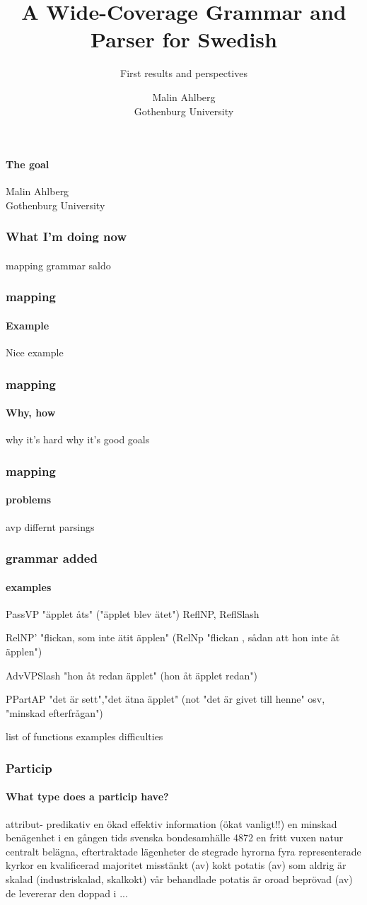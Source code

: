 \documentclass[10pt]{beamer}
\title{A Wide-Coverage Grammar and Parser for Swedish}
\subtitle{\large First results and perspectives}
\author{Malin Ahlberg \\ Gothenburg University}
\date{}
\begin{document}
\maketitle

\begin{frame}
    \framesubtitle{The goal}
    Malin Ahlberg \\
 \pause 
    Gothenburg University
\end{frame}

\begin{frame}
\frametitle{What I'm doing now}
\framesubtitle{} 
mapping
grammar 
saldo
\end{frame}

\begin{frame}
\frametitle{mapping}
\framesubtitle{Example} 
Nice example
\end{frame}


\begin{frame}
\frametitle{mapping}
\framesubtitle{Why, how} 
why it's hard
why it's good
goals
\end{frame}

\begin{frame}
\frametitle{mapping}
\framesubtitle{problems} 
avp
differnt parsings
\end{frame}

\begin{frame}
\frametitle{grammar added}
\framesubtitle{examples} 
PassVP "äpplet åts"
  ("äpplet blev ätet")
ReflNP, ReflSlash

RelNP' "flickan, som inte ätit äpplen"
 (RelNp "flickan , sådan att hon inte åt äpplen")

AdvVPSlash "hon åt redan äpplet" (hon åt äpplet redan")

PPartAP "det är sett","det ätna äpplet"
 (not "det är givet till henne" osv, "minskad efterfrågan")

list of functions
examples
difficulties
\end{frame}



\begin{frame}
\frametitle{Particip}
\framesubtitle{What type does a particip have?} 
attribut- predikativ
en ökad effektiv information (ökat vanligt!!)
en minskad benägenhet
i en gången tids svenska bondesamhälle  4872    
en fritt vuxen natur
centralt belägna, eftertraktade lägenheter
de stegrade hyrorna
fyra representerade kyrkor
en kvalificerad majoritet
misstänkt (av)
kokt potatis (av)
som aldrig är skalad (industriskalad, skalkokt)
vår behandlade potatis
är oroad
beprövad (av)
de levererar den doppad i ...
\end{frame}
\end{document}
